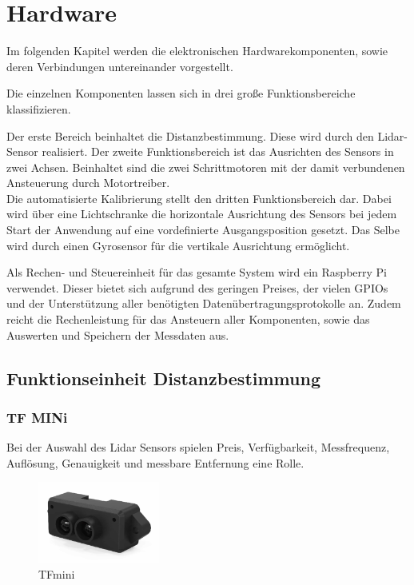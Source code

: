 
\chapter{Hardware}

Im folgenden Kapitel werden die elektronischen Hardwarekomponenten, sowie deren Verbindungen untereinander vorgestellt. 

Die einzelnen Komponenten lassen sich in drei große Funktionsbereiche klassifizieren.

Der erste Bereich beinhaltet die Distanzbestimmung. Diese wird durch den Lidar-Sensor realisiert.
Der zweite Funktionsbereich ist das Ausrichten des Sensors in zwei Achsen. Beinhaltet sind die zwei Schrittmotoren mit der damit verbundenen Ansteuerung durch Motortreiber. \\
Die automatisierte Kalibrierung stellt den dritten Funktionsbereich dar. Dabei wird über eine Lichtschranke die horizontale Ausrichtung des Sensors bei jedem Start der Anwendung auf eine vordefinierte Ausgangsposition gesetzt. Das Selbe wird durch einen Gyrosensor für die vertikale Ausrichtung ermöglicht.

Als Rechen- und Steuereinheit für das gesamte System wird ein Raspberry Pi verwendet. Dieser bietet sich aufgrund des geringen Preises, der vielen GPIOs und der Unterstützung aller benötigten Datenübertragungsprotokolle an. Zudem reicht die Rechenleistung für das Ansteuern aller Komponenten, sowie das Auswerten und Speichern der Messdaten aus.\\

\section{Funktionseinheit Distanzbestimmung}


\subsection{TF MINi}

Bei der Auswahl des Lidar Sensors spielen Preis, Verfügbarkeit, Messfrequenz, Auflösung, Genauigkeit und messbare Entfernung eine Rolle.


\begin{figure}
	\vspace{-22pt}
	\hspace{5mm}
	\includegraphics[width=4cm]{images/Hardware/TFmini.png}
	\caption{TFmini}
	\vspace{-10pt}
	
\end{figure}

